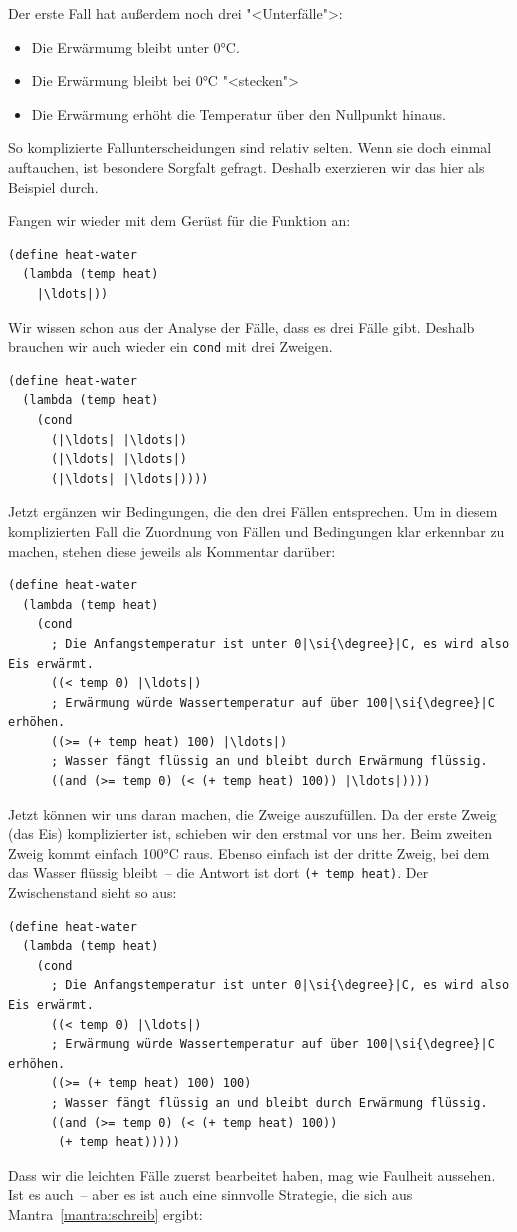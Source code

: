 %
Der erste Fall hat außerdem noch drei "<Unterfälle">:
%
\begin{itemize}
\item Die Erwärmumg bleibt unter $0$\si{\degree}C.
\item Die Erwärmung bleibt bei  $0$\si{\degree}C "<stecken">
\item Die Erwärmung erhöht die Temperatur über den Nullpunkt hinaus.
\end{itemize}
%
So komplizierte Fallunterscheidungen sind relativ selten. Wenn sie
doch einmal auftauchen, ist besondere Sorgfalt gefragt.  Deshalb
exerzieren wir das hier als Beispiel durch.

Fangen wir wieder mit dem Gerüst für die Funktion an:
%
\begin{lstlisting}
(define heat-water
  (lambda (temp heat)
    |\ldots|))
\end{lstlisting}
%
Wir wissen schon aus der Analyse der Fälle, dass es drei Fälle gibt.
Deshalb brauchen wir auch wieder ein \lstinline{cond} mit drei Zweigen.
%
\begin{lstlisting}
(define heat-water
  (lambda (temp heat)
    (cond
      (|\ldots| |\ldots|)
      (|\ldots| |\ldots|)
      (|\ldots| |\ldots|))))
\end{lstlisting}
%
Jetzt ergänzen wir Bedingungen, die den drei Fällen entsprechen.  Um
in diesem komplizierten Fall die Zuordnung von Fällen und Bedingungen
klar erkennbar zu machen, stehen diese jeweils als Kommentar darüber:
%
\begin{lstlisting}
(define heat-water
  (lambda (temp heat)
    (cond
      ; Die Anfangstemperatur ist unter 0|\si{\degree}|C, es wird also Eis erwärmt.
      ((< temp 0) |\ldots|)
      ; Erwärmung würde Wassertemperatur auf über 100|\si{\degree}|C erhöhen.
      ((>= (+ temp heat) 100) |\ldots|)
      ; Wasser fängt flüssig an und bleibt durch Erwärmung flüssig.
      ((and (>= temp 0) (< (+ temp heat) 100)) |\ldots|))))
\end{lstlisting}
%
Jetzt können wir uns daran machen, die Zweige auszufüllen.  Da der
erste Zweig (das Eis) komplizierter ist, schieben wir den erstmal vor
uns her.  Beim zweiten Zweig kommt einfach 100\si{\degree}C raus.  Ebenso
einfach ist der dritte Zweig, bei dem das Wasser flüssig bleibt~-- die
Antwort ist dort \mbox{\lstinline{(+ temp heat)}}.  Der Zwischenstand sieht so
aus:
%
\begin{lstlisting}
(define heat-water
  (lambda (temp heat)
    (cond
      ; Die Anfangstemperatur ist unter 0|\si{\degree}|C, es wird also Eis erwärmt.
      ((< temp 0) |\ldots|)
      ; Erwärmung würde Wassertemperatur auf über 100|\si{\degree}|C erhöhen.
      ((>= (+ temp heat) 100) 100)
      ; Wasser fängt flüssig an und bleibt durch Erwärmung flüssig.
      ((and (>= temp 0) (< (+ temp heat) 100))
       (+ temp heat)))))
\end{lstlisting}
%
Dass wir die leichten Fälle zuerst bearbeitet haben, mag wie Faulheit
aussehen.  Ist es auch~-- aber es ist auch eine sinnvolle Strategie, die
sich aus Mantra~\ref{mantra:schreib} ergibt:

